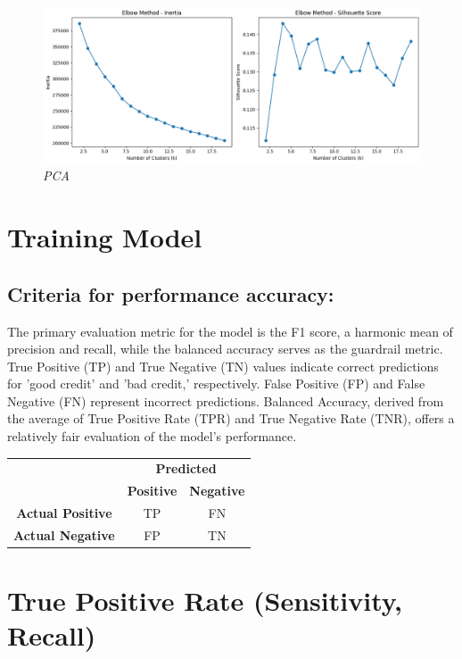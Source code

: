 \documentclass[10pt]{article}
\begin{document}
\begin{multicols}{2}
\begin{figure}[H]
    \centering
    \includegraphics[width=1\linewidth]{figure9.png}
    \caption{\justifying \textit{PCA}}
    \label{fig:PID Fuzzy}
\end{figure}


\section{Training Model}
\subsection{Criteria for performance accuracy: }
The primary evaluation metric for the model is the F1 score, a harmonic mean of precision and recall, while the balanced accuracy serves as the guardrail metric. True Positive (TP) and True Negative (TN) values indicate correct predictions for 'good credit' and 'bad credit,' respectively. False Positive (FP) and False Negative (FN) represent incorrect predictions. Balanced Accuracy, derived from the average of True Positive Rate (TPR) and True Negative Rate (TNR), offers a relatively fair evaluation of the model's performance.

\begin{left}
\begin{tabular}{c|c|c}
\multicolumn{1}{c}{} & \multicolumn{2}{c}{\textbf{Predicted}} \\
\cline{2-3}
\multicolumn{1}{c|}{} & \textbf{Positive} & \textbf{Negative} \\
\hline
\textbf{Actual Positive} & TP &  FN \\
\hline
\textbf{Actual Negative} & FP & TN \\
\end{tabular}
\end{left}

\section*{True Positive Rate (Sensitivity, Recall)}


\end{multicols}
\end{document}

